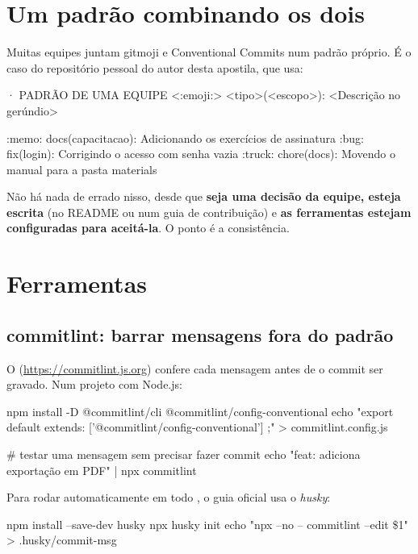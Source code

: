 \section{Um padrão combinando os dois}

Muitas equipes juntam gitmoji e Conventional Commits num padrão próprio. É o caso do repositório pessoal do autor desta apostila, que usa:

\begin{terminalt}{· PADRÃO DE UMA EQUIPE}
<:emoji:> <tipo>(<escopo>): <Descrição no gerúndio>

:memo: docs(capacitacao): Adicionando os exercícios de assinatura
:bug: fix(login): Corrigindo o acesso com senha vazia
:truck: chore(docs): Movendo o manual para a pasta materials
\end{terminalt}

Não há nada de errado nisso, desde que \textbf{seja uma decisão da equipe, esteja escrita} (no README ou num guia de contribuição) e \textbf{as ferramentas estejam configuradas para aceitá-la}. O ponto é a consistência.

\section{Ferramentas}
\label{sec:commitlint}

\subsection*{commitlint: barrar mensagens fora do padrão}

O  (\url{https://commitlint.js.org}) confere cada mensagem antes de o commit ser gravado. Num projeto com Node.js:

\begin{terminal}
npm install -D @commitlint/cli @commitlint/config-conventional
echo "export default { extends: ['@commitlint/config-conventional'] };" > commitlint.config.js

# testar uma mensagem sem precisar fazer commit
echo "feat: adiciona exportação em PDF" | npx commitlint
\end{terminal}

Para rodar automaticamente em todo , o guia oficial usa o \emph{husky}:

\begin{terminal}
npm install --save-dev husky
npx husky init
echo "npx --no -- commitlint --edit \$1" > .husky/commit-msg
\end{terminal}

